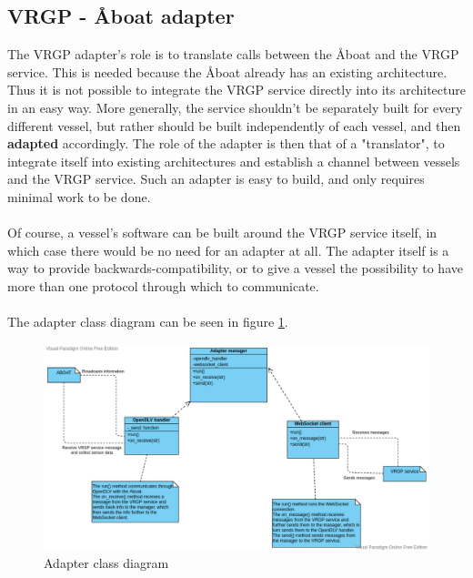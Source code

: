 \subsection{VRGP - Åboat adapter}

The VRGP adapter's role is to translate calls between the Åboat and the VRGP service. This is needed because the Åboat already has an existing architecture. Thus it is not possible to integrate the VRGP service directly into its architecture in an easy way. More generally, the service shouldn't be separately built for every different vessel, but rather should be built independently of each vessel, and then \textbf{adapted} accordingly. The role of the adapter is then that of a "translator", to integrate itself into existing architectures and establish a channel between vessels and the VRGP service. Such an adapter is easy to build, and only requires minimal work to be done.
\\\\
Of course, a vessel's software can be built around the VRGP service itself, in which case there would be no need for an adapter at all. The adapter itself is a way to provide backwards-compatibility, or to give a vessel the possibility to have more than one protocol through which to communicate.
\\\\
The adapter class diagram can be seen in figure \ref{fig:adapter-class-diagram}.

\begin{figure}[ht]
	\centering
	\includegraphics[width=\linewidth]{diagrams/ClassDiagramAdapter}
	\caption{Adapter class diagram}
	\label{fig:adapter-class-diagram}
\end{figure}
